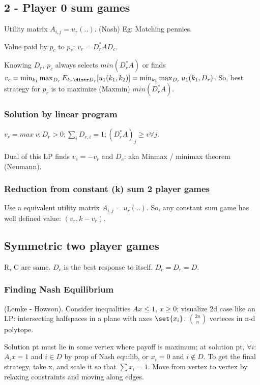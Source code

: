 \documentclass[oneside, article]{memoir}
\begin{document}
\subsection{2 - Player 0 sum games}
Utility matrix $A_{i,j} = u_{r}(..)$. (Nash) Eg: Matching pennies.

Value paid by $p_{c}$ to $p_{r}$: $v_{r} = D_{r}^{*} AD_{c}$.

Knowing $D_{r}$, $p_{c}$ always selects $min(D_{r}^{*}A)$ or finds \\$v_{c} = \min_{k_{1}} \max_{D_{r}} E_{k_{r} \distr D_{r}}[u_{1}(k_{1}, k_{2})] = \min_{k_{1}} \max_{D_{r}} u_{1}(k_{1},D_{r})$. So, best strategy for $p_{r}$ is to maximize (Maxmin) $min(D_{r}^{*}A)$.

\subsubsection{Solution by linear program}
$v_{r} = max\ v; D_{r}>0; \sum_{i} D_{r,i} = 1; (D_{r}^{*}A)_{j} \geq v \forall j$.

Dual of this LP finds $v_{c} = -v_{r}$ and $D_{c}$: aka Minmax / minimax theorem (Neumann).

\subsubsection{Reduction from constant (k) sum 2 player games}
Use a equivalent utility matrix $A_{i,j} = u_{r}(..)$. So, any constant sum game has well defined value: $(v_{r}, k-v_{r})$.

\subsection{Symmetric two player games}
R, C are same. $D_{c}$ is the best response to itself. $D_{c} = D_{r} = D$.

\subsubsection{Finding Nash Equilibrium}
(Lemke - Howson). Consider inequalities $Ax \leq 1$, $x \geq 0$; visualize 2d case like an LP: intersecting halfspaces in a plane with axes $\set{x_{i}}$. $\binom{2n}{n}$ verteces in n-d polytope.

Solution pt must lie in some vertex where payoff is maximum; at solution pt, $\forall i$: $A_{i}x = 1$ and $i \in D$ by prop of Nash equilib, or $x_{i} = 0$ and $i \notin D$. To get the final strategy, take x, and scale it so that $\sum x_{i}=1$. Move from vertex to vertex by relaxing constraints and moving along edges.
\end{document}
